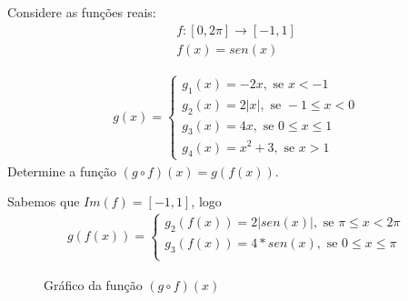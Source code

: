 \begin{exem}
Considere as funções reais:
\begin{eqnarray}
f: [0, 2\pi] \to [-1, 1] \\
f(x)= sen(x)
\end{eqnarray}

\begin{eqnarray}
g(x)= \begin{cases}
      g_1(x)= -2x, \text{ se } x < -1 \\
      g_2(x)= 2|x|, \text{ se } -1 \leqslant x < 0 \\
      g_3(x)= 4x, \text{ se } 0 \leqslant x \leqslant 1 \\
      g_4(x)= x^2 + 3, \text{ se } x > 1
      \end{cases}
\end{eqnarray}
Determine a função $(g \circ f)(x)= g(f(x))$.

\begin{resol}
Sabemos que $Im(f)= [-1, 1]$, logo
\begin{eqnarray}
g(f(x))= \begin{cases}
      g_2(f(x))= 2|sen(x)|, \text{ se } \pi \leqslant x < 2\pi \\
      g_3(f(x))= 4*sen(x), \text{ se }  0 \leqslant x \leqslant \pi \\
      \end{cases}
\end{eqnarray}
  \begin{figure}[H]
 \centering
    \caption{Gráfico da função $(g \circ f)(x)$}
  \end{figure}
\end{resol}
\end{exem}

